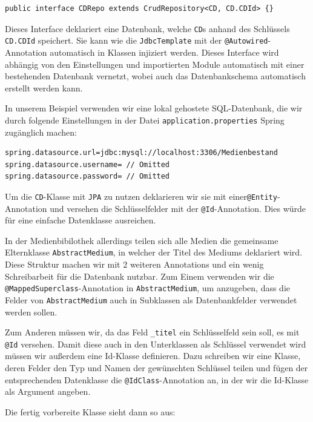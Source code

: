\documentclass{article}
\begin{document}
\begin{lstlisting}
public interface CDRepo extends CrudRepository<CD, CD.CDId> {}
\end{lstlisting}

Dieses Interface deklariert eine Datenbank, welche \texttt{CD}s anhand des Schlüssels \texttt{CD.CDId} speichert.
Sie kann wie die \texttt{JdbcTemplate} mit der \texttt{@Autowired}-Annotation automatisch in Klassen injiziert werden.
Dieses Interface wird abhängig von den Einstellungen und importierten Module automatisch mit einer bestehenden Datenbank vernetzt, wobei auch das Datenbankschema automatisch erstellt werden kann.

In unserem Beispiel verwenden wir eine lokal gehostete SQL-Datenbank, die wir durch folgende Einstellungen in der Datei \texttt{application.properties} Spring zugänglich machen:

\begin{lstlisting}
spring.datasource.url=jdbc:mysql://localhost:3306/Medienbestand 
spring.datasource.username= // Omitted
spring.datasource.password= // Omitted
\end{lstlisting}

Um die \texttt{CD}-Klasse mit \texttt{JPA} zu nutzen deklarieren wir sie mit einer\texttt{@Entity}-Annotation und versehen die Schlüsselfelder mit der \texttt{@Id}-Annotation.
Dies würde für eine einfache Datenklasse ausreichen.

In der Medienbibilothek allerdings teilen sich alle Medien die gemeinsame Elternklasse \texttt{AbstractMedium}, in welcher der Titel des Mediums deklariert wird.
Diese Struktur machen wir mit 2 weiteren Annotations und ein wenig Schreibarbeit für die Datenbank nutzbar.
Zum Einem verwenden wir die \texttt{@MappedSuperclass}-Annotation in \texttt{AbstractMedium}, um anzugeben, dass die Felder von \texttt{AbstractMedium} auch in Subklassen als Datenbankfelder verwendet werden sollen.

Zum Anderen müssen wir, da das Feld \texttt{\_titel} ein Schlüsselfeld sein soll, es mit \texttt{@Id} versehen.
Damit diese auch in den Unterklassen als Schlüssel verwendet wird müssen wir außerdem eine Id-Klasse definieren.
Dazu schreiben wir eine Klasse, deren Felder den Typ und Namen der gewünschten Schlüssel teilen und fügen der entsprechenden Datenklasse die \texttt{@IdClass}-Annotation an, in der wir die Id-Klasse als Argument angeben.

Die fertig vorbereite Klasse sieht dann so aus:
\end{document}
